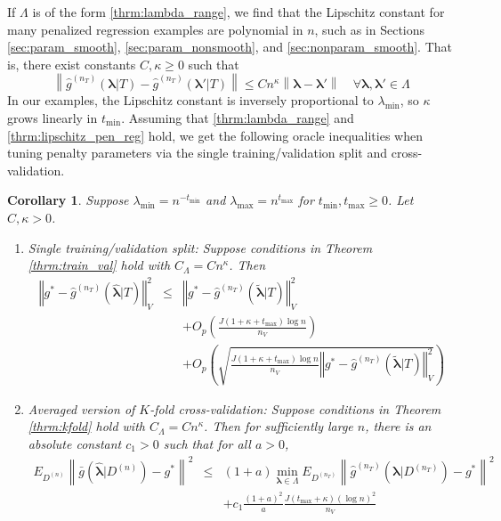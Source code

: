 \documentclass[12pt]{article}
\newtheorem{corollary}{Corollary}
\begin{document}
If $\Lambda$ is of the form \eqref{thrm:lambda_range}, we find that the Lipschitz constant for many penalized regression examples are polynomial in $n$, such as in Sections \ref{sec:param_smooth}, \ref{sec:param_nonsmooth}, and \ref{sec:nonparam_smooth}. That is, there exist constants $C, \kappa \ge 0$ such that
\begin{equation}
\label{thrm:lipschitz_pen_reg}
\left \| \hat{g}^{(n_T)}(\boldsymbol{\lambda}|T) - \hat{g}^{(n_T)}(\boldsymbol{\lambda}'|T) \right \| \le C n^\kappa \left \| \boldsymbol{\lambda} - \boldsymbol{\lambda}' \right \| \quad \forall \boldsymbol{\lambda}, \boldsymbol{\lambda}' \in \Lambda
\end{equation}
In our examples, the Lipschitz constant is inversely proportional to $\lambda_{\min}$, so $\kappa$ grows linearly in $t_{\min}$. Assuming that \eqref{thrm:lambda_range} and \eqref{thrm:lipschitz_pen_reg} hold, we get the following oracle inequalities when tuning penalty parameters via the single training/validation split and cross-validation. 
\begin{corollary}
	 Suppose $\lambda_{\min} = n^{-t_{\min}}$ and $\lambda_{\max} = n^{t_{\max}}$ for $t_{\min}, t_{\max} \ge 0$. Let $C, \kappa  > 0$.
	 
	 \begin{enumerate}
	 	\item Single training/validation split: Suppose conditions in Theorem \ref{thrm:train_val} hold with $C_\Lambda = C n^\kappa$. Then 
		\begin{eqnarray}
		\left\Vert g^* - \hat{g}^{(n_T)}( \hat{\boldsymbol{\lambda}} | T) \right\Vert _{V}^2 &\le& \left\Vert g^* - \hat{g}^{(n_T)}( \tilde{\boldsymbol{\lambda}} | T) \right \Vert^2_{V}\\
		&& + O_p \left(\frac{J (1 + \kappa + t_{\max})\log n}{n_{V}} \right) 
		\\
		&& + O_p \left(
		\sqrt{
			\frac{J (1 + \kappa + t_{\max})\log n}{n_{V}}
			\left\Vert g^* - \hat{g}^{(n_T)}( \tilde{\boldsymbol{\lambda}}| T) \right \Vert^2_{V}
		}
		\right )
		\end{eqnarray}
	 	
	 	\item Averaged version of $K$-fold cross-validation: Suppose conditions in Theorem \ref{thrm:kfold}  hold with $C_\Lambda = C n^\kappa$. Then for sufficiently large $n$, there is an absolute constant $c_1 > 0$ such that for all $a > 0$,
	 	\begin{eqnarray}
	 	E_{D^{(n)}} \left \| \bar{g} ( \hat{\boldsymbol \lambda} | {D^{(n)}} ) - g^* \right \|^2 &\le&
	 	(1+a) \min_{\boldsymbol{\lambda} \in \Lambda}  E_{D^{(n_T)}} \left \| \hat{g}^{(n_T)}(\boldsymbol \lambda | D^{(n_T)}) - g^* \right \|^2 \\
	 	&& + c_1 \frac{(1+a)^2}{a} 
	 	\frac{J (t_{\max} + \kappa) (\log n)^2}{n_V} 
	 	\end{eqnarray}
	 \end{enumerate}
\end{corollary}
\end{document}
